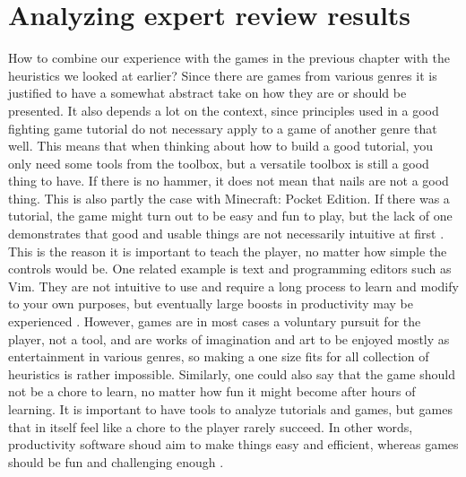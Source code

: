 \chapter{Analyzing expert review results}

How to combine our experience with the games in the previous chapter with the heuristics we looked at earlier? Since there are games from various genres it is justified to have a somewhat abstract take on how they are or should be presented. It also depends a lot on the context, since principles used in a good fighting game tutorial do not necessary apply to a game of another genre that well. This means that when thinking about how to build a good tutorial, you only need some tools from the toolbox, but a versatile toolbox is still a good thing to have. If there is no hammer, it does not mean that nails are not a good thing. This is also partly the case with Minecraft: Pocket Edition. If there was a tutorial, the game might turn out to be easy and fun to play, but the lack of one demonstrates that good and usable things are not necessarily intuitive at first \cite{Raskin1994}. This is the reason it is important to teach the player, no matter how simple the controls would be. One related example is text and programming editors such as Vim. They are not intuitive to use and require a long process to learn and modify to your own purposes, but eventually large boosts in productivity may be experienced \cite{Robbins2008}. However, games are in most cases a voluntary pursuit for the player, not a tool, and are works of imagination and art to be enjoyed mostly as entertainment in various genres, so making a one size fits for all collection of heuristics is rather impossible. Similarly, one could also say that the game should not be a chore to learn, no matter how fun it might become after hours of learning. It is important to have tools to analyze tutorials and games, but games that in itself feel like a chore to the player rarely succeed. In other words, productivity software shoud aim to make things easy and efficient, whereas games should be fun and challenging enough \cite{Pagulayan2003}. 

